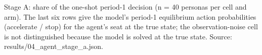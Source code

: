 \documentclass[varwidth=\maxdimen,border=4pt]{standalone}
\begin{document}
\usebox{\tb}
\par\vspace{3pt}\parbox{\wd\tb}{\footnotesize Stage A: share of the one-shot period-1 decision (n = 40 personas per cell and arm). The last six rows give the model's period-1 equilibrium action probabilities (accelerate / stop) for the agent's seat at the true state; the observation-noise cell is not distinguished because the model is solved at the true state. Source: results/04\_agent\_stage\_a.json.}
\end{document}

